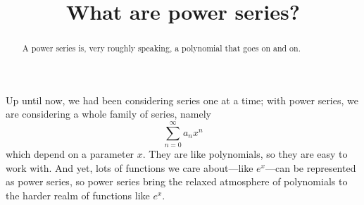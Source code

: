\documentclass{ximera}
\title{What are power series?}
\begin{document}
\begin{abstract}
  A power series is, very roughly speaking, a polynomial that goes on and on.
\end{abstract}

\maketitle

Up until now, we had been considering series one at a time; with power
series, we are considering a whole family of series,
namely \[\sum_{n=0}^\infty a_n x^n\] which depend on a parameter
\(x\).  They are like polynomials, so they are easy to work with.  And
yet, lots of functions we care about---like \(e^x\)---can be
represented as power series, so power series bring the relaxed
atmosphere of polynomials to the harder realm of functions like
\(e^x\).
\end{document}
